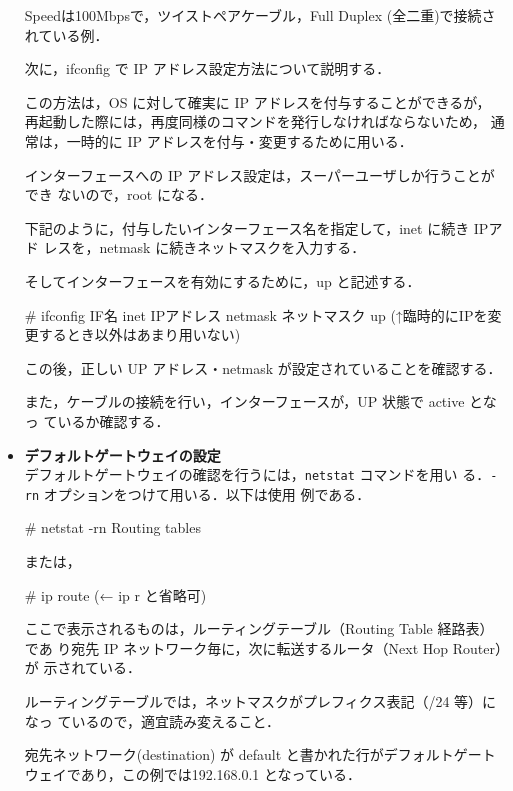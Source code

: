 \begin{itemize}
\begin{cli}
Speedは100Mbpsで，ツイストペアケーブル，Full Duplex (全二重)で接続されている例．

\end{cli}

次に，ifconfig で IP アドレス設定方法について説明する．

この方法は，OS に対して確実に IP アドレスを付与することができるが，
再起動した際には，再度同様のコマンドを発行しなければならないため，
通常は，一時的に IP アドレスを付与・変更するために用いる．

インターフェースへの IP アドレス設定は，スーパーユーザしか行うことができ
     ないので，root になる．

下記のように，付与したいインターフェース名を指定して，inet に続き IPアド
レスを，netmask に続きネットマスクを入力する．

そしてインターフェースを有効にするために，up と記述する．

\begin{cli}
# ifconfig IF名 inet IPアドレス netmask ネットマスク up
(↑臨時的にIPを変更するとき以外はあまり用いない)
\end{cli}

この後，正しい UP アドレス・netmask が設定されていることを確認する．

また，ケーブルの接続を行い，インターフェースが，UP 状態で active となっ
     ているか確認する．

\item{\bf デフォルトゲートウェイの設定}\\

デフォルトゲートウェイの確認を行うには，\texttt{netstat} コマンドを用い
る．\texttt{-rn} オプションをつけて用いる．以下は使用
例である．

\begin{cli}
# netstat -rn
Routing tables

または，

# ip route (← ip r と省略可)
\end{cli}

ここで表示されるものは，ルーティングテーブル（Routing Table 経路表）であ
     り宛先 IP ネットワーク毎に，次に転送するルータ（Next Hop Router）が
     示されている．

ルーティングテーブルでは，ネットマスクがプレフィクス表記（/24 等）になっ
ているので，適宜読み変えること．

宛先ネットワーク(destination) が default と書かれた行がデフォルトゲート
     ウェイであり，この例では192.168.0.1 となっている．


\end{itemize}
